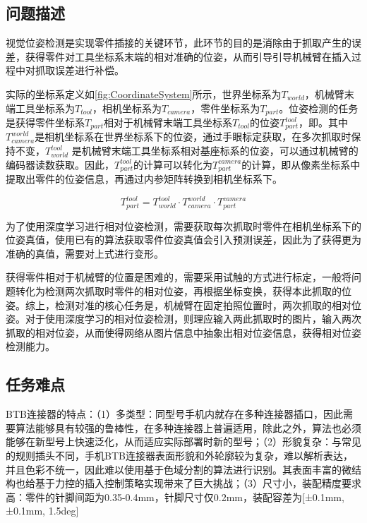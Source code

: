 \documentclass{Diploma}
\begin{document}
\subsection{问题描述}
视觉位姿检测是实现零件插接的关键环节，此环节的目的是消除由于抓取产生的误差，获得零件对工具坐标系末端的相对准确的位姿，从而引导引导机械臂在插入过程中对抓取误差进行补偿。

%

实际的坐标系定义如\ref{fig:CoordinateSystem}所示，世界坐标系为$T_{world}$，机械臂末端工具坐标系为$T_{tool}$，相机坐标系为$T_{camera}$，零件坐标系为$T_{part}$。位姿检测的任务是获得零件坐标系$T_{part}$相对于机械臂末端工具坐标系$T_{tool}$的位姿$T_{part}^{tool}$，即。其中$T_{camera}^{world}$是相机坐标系在世界坐标系下的位姿，通过手眼标定获取，在多次抓取时保持不变，$T_{world}^{tool}$ 是机械臂末端工具坐标系相对基座标系的位姿，可以通过机械臂的编码器读数获取。因此，$T_{part}^{tool}$的计算可以转化为$T_{part}^{camera}$的计算，即从像素坐标系中提取出零件的位姿信息，再通过内参矩阵转换到相机坐标系下。

\begin{equation}
  T_{part}^{tool} =T_{world}^{tool} \cdot T_{camera}^{world} \cdot T_{part}^{camera} \label{eq:pose1}
\end{equation}

为了使用深度学习进行相对位姿检测，需要获取每次抓取时零件在相机坐标系下的位姿真值，使用已有的算法获取零件位姿真值会引入预测误差，因此为了获得更为准确的真值，需要对上式进行变形。

获得零件相对于机械臂的位置是困难的，需要采用试触的方式进行标定，一般将问题转化为检测两次抓取时零件的相对位姿，再根据坐标变换，获得本此抓取的位姿。综上，检测对准的核心任务是，机械臂在固定拍照位置时，两次抓取的相对位姿。对于使用深度学习的相对位姿检测，则理应输入两此抓取时的图片，输入两次抓取的相对位姿，从而使得网络从图片信息中抽象出相对位姿信息，获得相对位姿检测能力。

%
\subsection{任务难点}
BTB连接器的特点：（1）多类型：同型号手机内就存在多种连接器插口，因此需要算法能够具有较强的鲁棒性，在多种连接器上普遍适用，除此之外，算法也必须能够在新型号上快速泛化，从而适应实际部署时新的型号；（2）形貌复杂：与常见的规则插头不同，手机BTB连接器表面形貌和外轮廓较为复杂，难以解析表达，并且色彩不统一，因此难以使用基于色域分割的算法进行识别。其表面丰富的微结构也给基于力控的插入控制策略实现带来了巨大挑战；（3）尺寸小，装配精度要求高：零件的针脚间距为0.35-0.4mm，针脚尺寸仅0.2mm，装配容差为[±0.1mm, ±0.1mm, 1.5deg]
\end{document}
